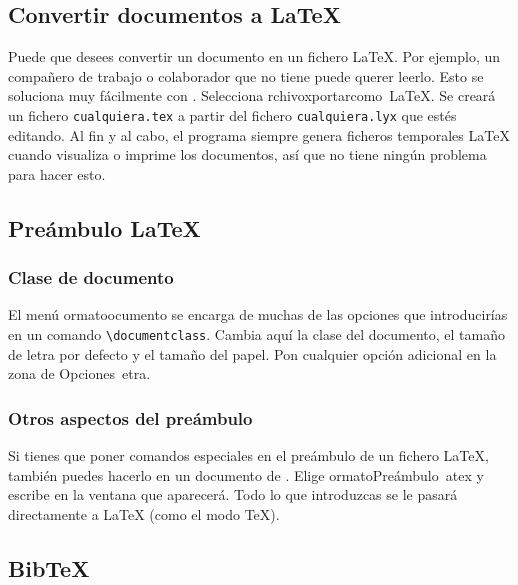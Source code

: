 \subsection{Convertir documentos \LyX{} a \LaTeX{}}

Puede que desees convertir un documento \LyX{} en un fichero \LaTeX{}.
Por ejemplo, un compañero de trabajo o colaborador que no tiene \LyX{}
puede querer leerlo. Esto se soluciona muy fácilmente con \LyX{}.
Selecciona \textsf{}\textsf{rchivo\lyxarrow{}}\textsf{}\textsf{xportar\lyxarrow{}como~\LaTeX{}}.
Se creará un fichero \texttt{cualquiera.tex} a partir del fichero
\texttt{cualquiera.lyx} que estés editando. Al fin y al cabo, el programa
siempre genera ficheros temporales \LaTeX{} cuando visualiza o imprime
los documentos, así que no tiene ningún problema para hacer esto.


\subsection{Preámbulo \LaTeX{}}


\subsubsection{Clase de documento }

El menú \textsf{}\textsf{ormato\lyxarrow{}}\textsf{}\textsf{ocumento}
se encarga de muchas de las opciones que introducirías en un comando
\texttt{\textbackslash{}documentclass}. Cambia aquí la clase del documento,
el tamaño de letra por defecto y el tamaño del papel. Pon cualquier
opción adicional en la zona de \textsf{Opciones~e}\textsf{}\textsf{tra}.


\subsubsection{Otros aspectos del preámbulo}

\label{sec:preamble}Si tienes que poner comandos especiales en el
preámbulo de un fichero \LaTeX{}, también puedes hacerlo en un documento
de \LyX{}. Elige \textsf{}\textsf{ormato\lyxarrow{}Preámbulo~}\textsf{}\textsf{atex}
y escribe en la ventana que aparecerá. Todo lo que introduzcas se
le pasará directamente a \LaTeX{} (como el modo \TeX{}).


\subsection{Bib\TeX{}}

